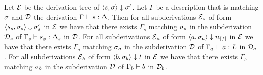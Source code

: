 \begin{theorem}
    \label{thm:progress}
    Let $\operatorname{\mathcal{E}}$ be the derivation tree of $\langle s, \sigma \rangle \downarrow \sigma'$.
    Let $\Gamma$ be a description that is matching $\sigma$ and
    $\operatorname{\mathcal{D}}$ the derivation $\Gamma \vdash {s}: \Delta$.
    Then for all subderivations $\operatorname{\mathcal{E}}_s$ of form $\langle s_s, \sigma_s \rangle \downarrow \sigma'_s$ in $\operatorname{\mathcal{E}}$
    we have that there exists $\Gamma_s$ matching $\sigma_s$
    in the subderivation $\operatorname{\mathcal{D}}_s$ of $\Gamma_s \vdash {s_s}: \Delta_s$ in $\operatorname{\mathcal{D}}$.
    For all subderivations $\operatorname{\mathcal{E}}_a$ of form $\bigstep{a}{\store_a}{\flagged{}}$ in $\operatorname{\mathcal{E}}$
    we have that there exists $\Gamma_a$ matching $\sigma_a$
    in the subderivation $\operatorname{\mathcal{D}}$ of $\Gamma_a \vdash {a}: L$ in $\operatorname{\mathcal{D}}_a$.
    For all subderivations $\operatorname{\mathcal{E}}_b$ of form $\langle b, \sigma_b \rangle \downarrow t$ in $\operatorname{\mathcal{E}}$
    we have that there exists $\Gamma_b$ matching $\sigma_b$
    in the subderivation $\operatorname{\mathcal{D}}$ of $\Gamma_b \vdash {b}$ in $\operatorname{\mathcal{D}}_b$.
\end{theorem}
